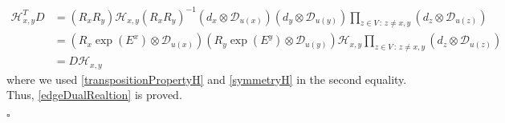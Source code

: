 \documentclass[10pt]{article}
\numberwithin{equation}{section}
\numberwithin{equation}{subsection}
\newcommand{\dd}{\mathcal{D}_{u(x)}}
\begin{document}
\begin{equation}
    \begin{split}
        \mathcal{H}_{x,y}^{T}D&=(R_{x}R_{y})\mathcal{H}_{x,y}(R_{x}R_{y})^{-1}\left(d_{x}\otimes\dd\right)\left(d_{y}\otimes\mathcal{D}_{u(y)}\right)\prod_{z\in V\,:\, z\neq x,y}\left(d_{z}\otimes \mathcal{D}_{u(z)}\right)
        \\&=\left(R_{x}\exp{(E^{x})}\otimes \dd\right)\left(R_{y}\exp{(E^{y})}\otimes \mathcal{D}_{u(y)}\right)\mathcal{H}_{x,y}\prod_{z\in V\,:\, z\neq x,y}\left(d_{z}\otimes \mathcal{D}_{u(z)}\right)
        \\&=
        D\mathcal{H}_{x,y}
    \end{split}
\end{equation}
 where we used \eqref{transpositionPropertyH} and \eqref{symmetryH} in the second equality. Thus, \eqref{edgeDualRealtion} is proved. 
 
 
 \begin{flushright}
     $\square$
 \end{flushright}
\end{document}
